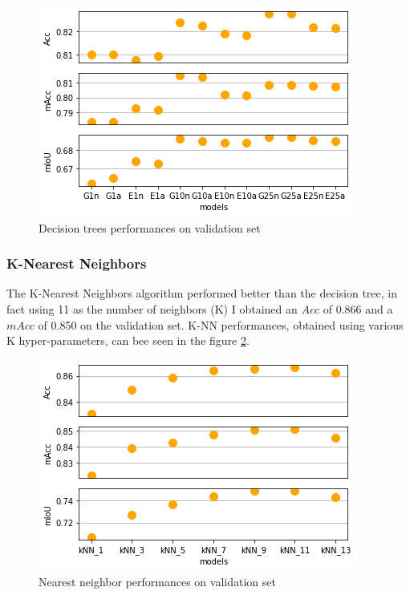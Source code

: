 \documentclass[10pt,twocolumn,letterpaper]{article}
\begin{document}
\begin{figure}[h]
\includegraphics[width=\linewidth]{DecisionTree}
\caption{Decision trees performances on validation set}
\label{fig:DecisionTree}
\end{figure}

\subsubsection{K-Nearest Neighbors}

The K-Nearest Neighbors algorithm performed better than the decision tree, in fact using 11 as the number of neighbors (K) I obtained an $Acc$ of 0.866 and a $mAcc$ of 0.850 on the validation set.
K-NN performances, obtained using various K hyper-parameters, can bee seen in the figure \ref{fig:NearestNeighbor}.

\begin{figure}[h]
\includegraphics[width=\linewidth]{NearestNeighbor}
\caption{Nearest neighbor performances on validation set}
\label{fig:NearestNeighbor}
\end{figure}
\end{document}
